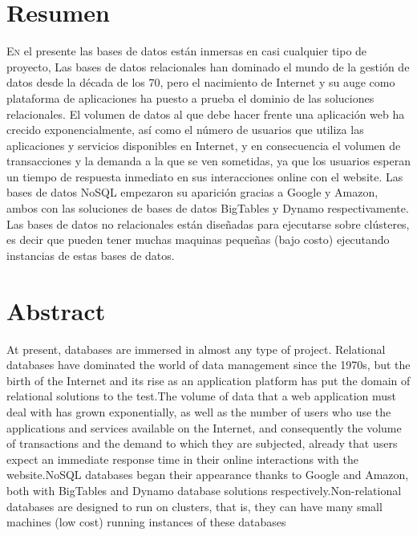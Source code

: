 \documentclass[twoside,twocolumn]{article}
\begin{document}

\section{Resumen}

\lettrine[nindent=0em,lines=3]{E}n el presente las bases de datos están inmersas en casi cualquier tipo de proyecto, Las bases de datos relacionales han dominado el mundo de la gestión de datos desde la década de los 70, pero el nacimiento de Internet y su auge como plataforma de aplicaciones ha puesto a prueba el dominio de las soluciones relacionales.
El volumen de datos al que debe hacer frente una aplicación web ha crecido exponencialmente, así como el número de usuarios que utiliza las aplicaciones y servicios disponibles en Internet, y en consecuencia el volumen de transacciones y la demanda a la que se ven sometidas, ya que los usuarios esperan un tiempo de respuesta inmediato en sus interacciones online con el website.
Las bases de datos NoSQL empezaron su aparición gracias a Google y Amazon, ambos con las soluciones de bases de datos BigTables y Dynamo respectivamente.
Las bases de datos no relacionales están diseñadas para ejecutarse sobre clústeres, es decir que pueden tener muchas maquinas pequeñas (bajo costo) ejecutando instancias de estas bases de datos.





\section{Abstract}


At present, databases are immersed in almost any type of project. 
Relational databases have dominated the world of data management since the 1970s,
but the birth of the Internet and its rise as an application platform has put 
the domain of relational solutions to the test.The volume of data that a web
application must deal with has grown exponentially, as well as the number of 
users who use the applications and services available on the Internet, and 
consequently the volume of transactions and the demand to which they are subjected,
already that users expect an immediate response time in their online interactions
with the website.NoSQL databases began their appearance thanks to Google and 
Amazon, both with BigTables and Dynamo database solutions
respectively.Non-relational databases are designed to run on clusters, that is,
they can have many small machines (low cost) running instances of these databases
\end{document}
